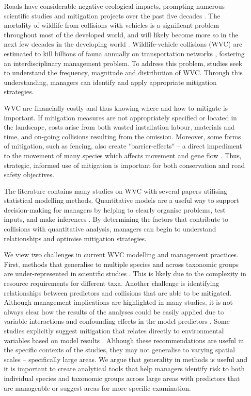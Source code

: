 Roads have considerable negative ecological impacts, prompting numerous scientific studies and mitigation projects over the past five decades \citep{form98,spel98,rvdr15}. The mortality of wildlife from collisions with vehicles is a significant problem throughout most of the developed world, and will likely become more so in the next few decades in the developing world \citep{rvdr15}. Wildlife-vehicle collisions (WVC) are estimated to kill billions of fauna annually on transportation networks \citep{seil06}, fostering an interdisciplinary management problem. To address this problem, studies seek to understand the frequency, magnitude and distribution of WVC.  Through this understanding, managers can identify and apply appropriate mitigation strategies.

WVC are financially costly \citep{biss08b,huij09,rowd08} and thus knowing where and how to mitigate is important.  If mitigation measures are not appropriately specified or located in the landscape, costs arise from both wasted installation labour, materials and time, and on-going collisions resulting from the omission.  Moreover, some forms of mitigation, such as fencing, also create "barrier-effects" -- a direct impediment to the movement of many species which affects movement and gene flow \citep{epps05}.  Thus, strategic, informed use of mitigation is important for both conservation and road safety objectives.

The literature contains many studies on WVC with several papers utilising statistical modelling methods.  Quantitative models are a useful way to support decision-making for managers by helping to clearly organise problems, test inputs, and make inferences \citep{ande15}.  By determining the factors that contribute to collisions with quantitative analysis, managers can begin to understand relationships and optimise mitigation strategies.

We view two challenges in current WVC modelling and management practices.  First, methods that generalise to multiple species and across taxonomic groups are under-represented in scientific studies \citep[see][]{farm12}.  This is likely due to the complexity in resource requirements for different taxa.  Another challenge is identifying relationships between predictors and collisions that are able to be mitigated.  Although management implications are highlighted in many studies, it is not always clear how the results of the analyses could be easily applied due to variable interactions and confounding effects in the model predictors \citep{guns11}.  Some studies explicitly suggest mitigation that relates directly to environmental variables based on model results \citep[see][]{gril09}.  Although these recommendations are useful in the specific contexts of the studies, they may not generalise to varying spatial scales -- specifically large areas. We argue that generality in methods is useful and it is important to create analytical tools that help managers identify risk to both individual species and taxonomic groups across large areas with predictors that are manageable or suggest areas for more specific examination.

